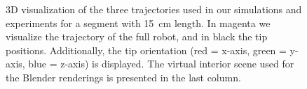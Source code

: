 \begin{figure}[ht]
  \centering
  \hspace{0.005\textwidth}%
  \hspace{0.005\textwidth}%
  \hfill
  \caption{3D visualization of the three trajectories used in our simulations and experiments for a segment with \SI{15}{cm} length. In magenta we visualize the trajectory of the full robot, and in black the tip positions. Additionally, the tip orientation (red = x-axis, green = y-axis, blue = z-axis) is displayed. The virtual interior scene used for the Blender renderings is presented in the last column.}
  \label{fig:srslam:trajectories}
\end{figure}

